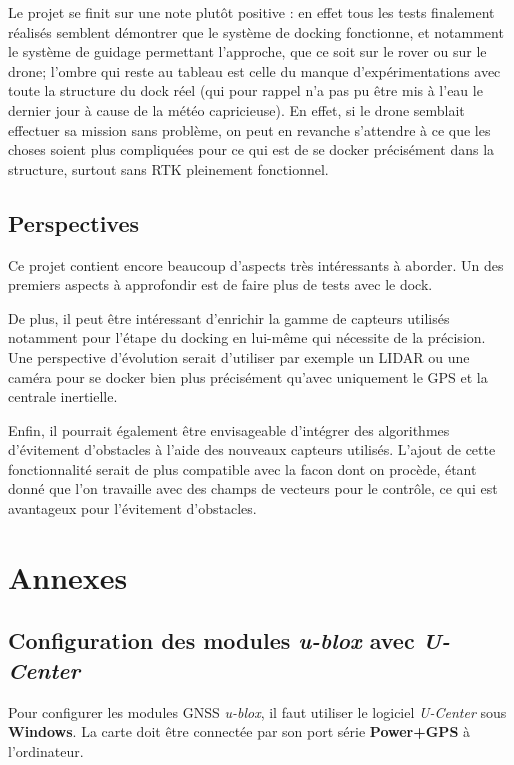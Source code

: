 \documentclass[12pt]{report}
\begin{document}
Le projet se finit sur une note plutôt positive : en effet tous les tests finalement réalisés semblent démontrer que le système de docking fonctionne, et notamment le système de guidage permettant l'approche, que ce soit sur le rover ou sur le drone; l'ombre qui reste au tableau est celle du manque d'expérimentations avec toute la structure du dock réel (qui pour rappel n'a pas pu être mis à l'eau le dernier jour à cause de la météo capricieuse). En effet, si le drone semblait effectuer sa mission sans problème, on peut en revanche s'attendre à ce que les choses soient plus compliquées pour ce qui est de se docker précisément dans la structure, surtout sans RTK pleinement fonctionnel.

\section{Perspectives}
Ce projet contient encore beaucoup d'aspects très intéressants à aborder. Un des premiers aspects à
approfondir est de faire plus de tests avec le dock.

De plus, il peut être intéressant d'enrichir la gamme de capteurs utilisés notamment pour l'étape du
docking en lui-même qui nécessite de la précision. Une perspective d'évolution serait d'utiliser par
exemple un LIDAR ou une caméra pour se docker bien plus précisément qu'avec uniquement le GPS et la
centrale inertielle.

Enfin, il pourrait également être envisageable d'intégrer des algorithmes d'évitement d'obstacles à
l'aide des nouveaux capteurs utilisés. L'ajout de cette fonctionnalité serait de plus compatible avec la
facon dont on procède, étant donné que l'on travaille avec des champs de vecteurs pour le contrôle, ce
qui est avantageux pour l'évitement d'obstacles.

\chapter{Annexes}
\section{Configuration des modules \textit{u-blox} avec \textit{U-Center}}
Pour configurer les modules GNSS \textit{u-blox}, il faut utiliser le logiciel \textit{U-Center} sous \textbf{Windows}. La carte doit être connectée par son port série \textbf{Power+GPS} à l'ordinateur.
\end{document}
